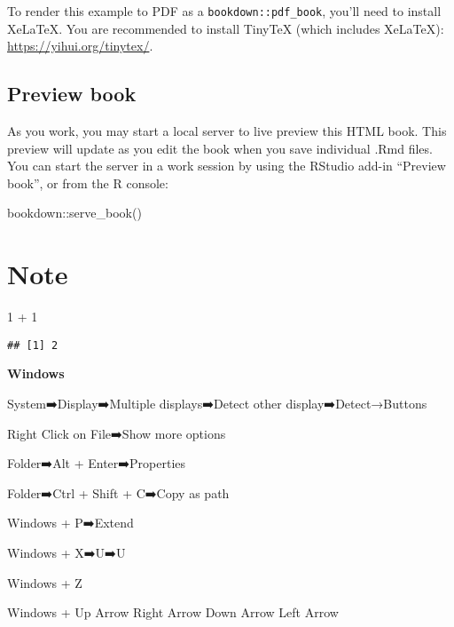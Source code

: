 \documentclass[
]{book}
\newenvironment{Shaded}{\begin{snugshade}}{\end{snugshade}}
\newcommand{\DecValTok}[1]{\textcolor[rgb]{0.00,0.00,0.81}{#1}}
\newcommand{\FunctionTok}[1]{\textcolor[rgb]{0.00,0.00,0.00}{#1}}
\newcommand{\NormalTok}[1]{#1}
\newcommand{\SpecialCharTok}[1]{\textcolor[rgb]{0.00,0.00,0.00}{#1}}
\begin{document}
To render this example to PDF as a \texttt{bookdown::pdf\_book}, you'll need to install XeLaTeX. You are recommended to install TinyTeX (which includes XeLaTeX): \url{https://yihui.org/tinytex/}.

\hypertarget{preview-book}{%
\section{Preview book}\label{preview-book}}

As you work, you may start a local server to live preview this HTML book. This preview will update as you edit the book when you save individual .Rmd files. You can start the server in a work session by using the RStudio add-in ``Preview book'', or from the R console:

\begin{Shaded}
\begin{Highlighting}[]
\NormalTok{bookdown}\SpecialCharTok{::}\FunctionTok{serve\_book}\NormalTok{()}
\end{Highlighting}
\end{Shaded}

\hypertarget{helloworld}{%
\chapter{Note}\label{helloworld}}

\begin{Shaded}
\begin{Highlighting}[]
\DecValTok{1} \SpecialCharTok{+} \DecValTok{1}
\end{Highlighting}
\end{Shaded}

\begin{verbatim}
## [1] 2
\end{verbatim}

\textbf{Windows}

System➡️Display➡️Multiple displays➡️Detect other display➡️Detect→Buttons

Right Click on File➡️Show more options

Folder➡️Alt + Enter➡️Properties

Folder➡️Ctrl + Shift + C➡️Copy as path

Windows + P➡️Extend

Windows + X➡️U➡️U

Windows + Z

Windows + Up Arrow \textbar{} Right Arrow \textbar{} Down Arrow \textbar{} Left Arrow
\end{document}
